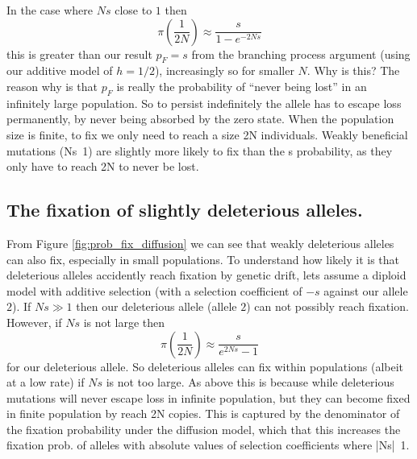 In the case where $Ns$ close to $1$ then
\begin{equation}
\pi \left( \frac{1}{2N} \right) \approx \frac{s}{1-e^{-2Ns}} \label{eqn:escape_from_intro}
\end{equation}
this is greater than our result $p_F=s$ from the branching process
argument (using our additive model of $h=1/2$), increasingly so for smaller $N$. 
Why is this?  The reason why is that $p_F$ is really the probability
of “never being lost” in an infinitely large population. So to persist
indefinitely the allele has to escape loss permanently, by never being
absorbed by the zero state. When the population size is finite, to fix
we only need to reach a size 2N individuals. Weakly beneficial
mutations (Ns~1) are slightly more likely to fix than the s
probability, as they only have to reach 2N to never be lost.



\subsection{The fixation of slightly deleterious alleles.}
From Figure \ref{fig:prob_fix_diffusion} we can see that weakly
deleterious alleles can also fix, especially in small populations.  To understand how
likely it is that deleterious alleles accidently reach fixation by
genetic drift, lets assume a diploid model with additive selection (with
a selection coefficient of $-s$ against our allele $2$).  
If $N s \gg 1$ then our deleterious allele (allele $2$) can not possibly reach
fixation. However, if $Ns$ is not large then
\begin{equation}
\pi \left( \frac{1}{2N} \right) \approx \frac{s}{e^{2Ns}-1} \label{eqn:fix_deleterious}
\end{equation}
for our deleterious allele. So deleterious alleles can fix within
populations (albeit at a low rate) if $Ns$ is not too large. As above
this is because while deleterious mutations will never escape loss in
infinite population, but they can become fixed in finite population by
reach 2N copies. This is captured by the denominator of the fixation
probability under the diffusion model, which that this increases the
fixation prob. of alleles with absolute values of selection coefficients where |Ns|~1.


